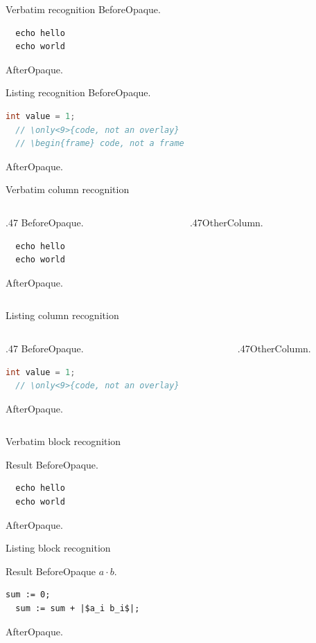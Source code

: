 \documentclass[aspectratio=169]{beamer}
\author{}
\date{}
\begin{document}
\begin{frame}[fragile]{Verbatim recognition}
BeforeOpaque.
\begin{verbatim}
  echo hello
  echo world
\end{verbatim}
AfterOpaque.
\end{frame}

\begin{frame}[fragile]{Listing recognition}
BeforeOpaque.
\begin{lstlisting}[language=Java]
  int value = 1;
  // \only<9>{code, not an overlay}
  // \begin{frame} code, not a frame
\end{lstlisting}
AfterOpaque.
\end{frame}

\begin{frame}[fragile]{Verbatim column recognition}
\begin{columns}[T,totalwidth=\textwidth]
\begin{column}{.47\textwidth}
BeforeOpaque.
\begin{verbatim}
  echo hello
  echo world
\end{verbatim}
AfterOpaque.
\end{column}
\begin{column}{.47\textwidth}OtherColumn.\end{column}
\end{columns}
\end{frame}

\begin{frame}[fragile]{Listing column recognition}
\begin{columns}[T,totalwidth=\textwidth]
\begin{column}{.47\textwidth}
BeforeOpaque.
\begin{lstlisting}[language=Java]
  int value = 1;
  // \only<9>{code, not an overlay}
\end{lstlisting}
AfterOpaque.
\end{column}
\begin{column}{.47\textwidth}OtherColumn.\end{column}
\end{columns}
\end{frame}

\begin{frame}[fragile]{Verbatim block recognition}
\begin{exampleblock}{Result}
BeforeOpaque.
\begin{verbatim}
  echo hello
  echo world
\end{verbatim}
AfterOpaque.
\end{exampleblock}
\end{frame}

\begin{frame}[fragile]{Listing block recognition}
\begin{exampleblock}{Result}
BeforeOpaque $a\cdot b$.
\begin{lstlisting}[escapechar=|]
  sum := 0;
  sum := sum + |$a_i b_i$|;
\end{lstlisting}
AfterOpaque.
\end{exampleblock}
\end{frame}
\end{document}
